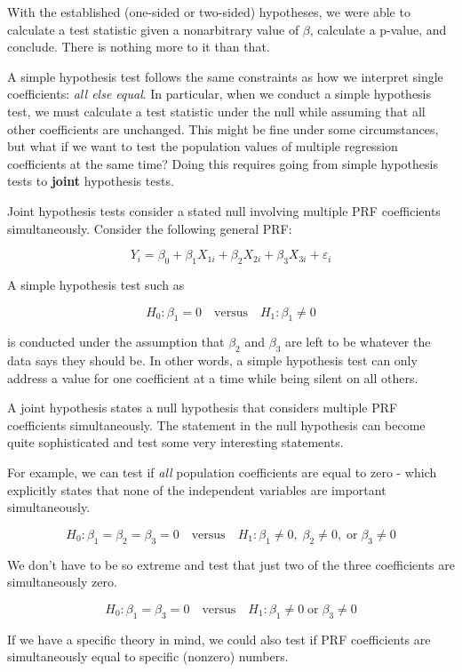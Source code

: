 \documentclass[
]{book}
\begin{document}
With the established (one-sided or two-sided) hypotheses, we were able to calculate a test statistic given a nonarbitrary value of \(\beta\), calculate a p-value, and conclude. There is nothing more to it than that.

A simple hypothesis test follows the same constraints as how we interpret single coefficients: \emph{all else equal}. In particular, when we conduct a simple hypothesis test, we must calculate a test statistic under the null while assuming that all other coefficients are unchanged. This might be fine under some circumstances, but what if we want to test the population values of multiple regression coefficients at the same time? Doing this requires going from simple hypothesis tests to \textbf{joint} hypothesis tests.

Joint hypothesis tests consider a stated null involving multiple PRF coefficients simultaneously. Consider the following general PRF:

\[Y_i = \beta_0 + \beta_1 X_{1i} + \beta_2 X_{2i} + \beta_3 X_{3i} + \varepsilon_i\]

A simple hypothesis test such as

\[H_0: \beta_1 = 0 \quad \text{versus} \quad H_1: \beta_1 \neq 0\]

is conducted under the assumption that \(\beta_2\) and \(\beta_3\) are left to be whatever the data says they should be. In other words, a simple hypothesis test can only address a value for one coefficient at a time while being silent on all others.

A joint hypothesis states a null hypothesis that considers multiple PRF coefficients simultaneously. The statement in the null hypothesis can become quite sophisticated and test some very interesting statements.

For example, we can test if \emph{all} population coefficients are equal to zero - which explicitly states that none of the independent variables are important simultaneously.

\[H_0: \beta_1 = \beta_2 = \beta_3 = 0 \quad \text{versus} \quad H_1: \beta_1 \neq 0,\; \beta_2 \neq 0,\; \text{or} \; \beta_3 \neq 0\]

We don't have to be so extreme and test that just two of the three coefficients are simultaneously zero.

\[H_0: \beta_1 = \beta_3 = 0 \quad \text{versus} \quad H_1: \beta_1 \neq 0\; \text{or} \; \beta_3 \neq 0\]

If we have a specific theory in mind, we could also test if PRF coefficients are simultaneously equal to specific (nonzero) numbers.
\end{document}

